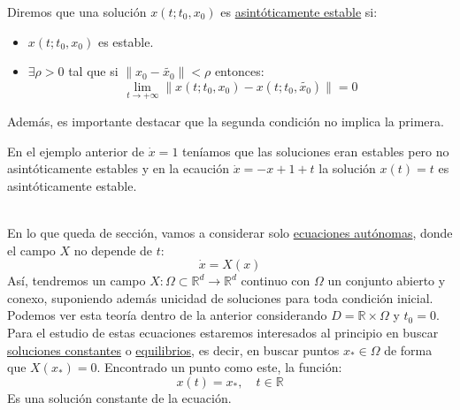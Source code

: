 \begin{definicion}
    Diremos que una solución $x(t;t_0,x_0)$ es \underline{asintóticamente estable} si:
    \begin{itemize}
        \item $x(t;t_0,x_0)$ es estable.
        \item $\exists \rho>0$ tal que si $\|x_0-\widetilde{x_0}\|<\rho$ entonces:
            \begin{equation*}
                \lim_{t\to+\infty}\|x(t;t_0,x_0)-x(t;t_0,\widetilde{x_0})\| = 0
            \end{equation*}
    \end{itemize}
\end{definicion}

\noindent
Además, es importante destacar que la segunda condición no implica la primera.

\begin{ejemplo}
    En el ejemplo anterior de $\dot{x} = 1$ teníamos que las soluciones eran estables pero no asintóticamente estables y en la ecaución $\dot{x} = -x+1+t$ la solución $x(t) = t$ es asintóticamente estable.
\end{ejemplo}~\\

\noindent
En lo que queda de sección, vamos a considerar solo \underline{ecuaciones autónomas}, donde el campo $X$ no depende de $t$:
\begin{equation*}
    \dot{x} = X(x)
\end{equation*}
Así, tendremos un campo $X:\Omega\subset\mathbb{R}^d\to\mathbb{R}^d$ continuo con $\Omega$ un conjunto abierto y conexo, suponiendo además unicidad de soluciones para toda condición inicial. Podemos ver esta teoría dentro de la anterior considerando $D=\mathbb{R}\times\Omega$ y $t_0=0$.\\

\noindent
Para el estudio de estas ecuaciones estaremos interesados al principio en buscar \underline{soluciones constantes} o \underline{equilibrios}, es decir, en buscar puntos $x_\ast \in \Omega$ de forma que $X(x_\ast)=0$. Encontrado un punto como este, la función:
\begin{equation*}
    x(t) = x_\ast, \quad t\in \mathbb{R}
\end{equation*}
Es una solución constante de la ecuación.

